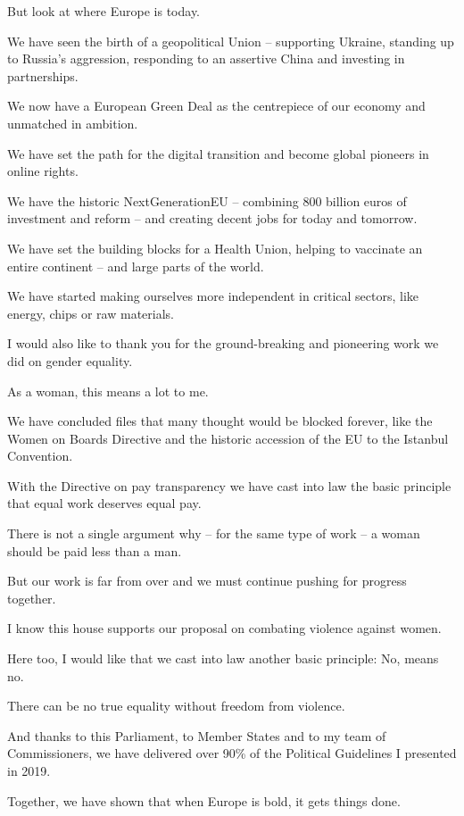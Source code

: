 \documentclass[a4paper,11pt]{article}
\begin{document}
But look at where Europe is today.

We have seen the birth of a geopolitical Union – supporting Ukraine, standing up to Russia's aggression, responding to an assertive China and investing in partnerships.

We now have a European Green Deal as the centrepiece of our economy and unmatched in ambition. 

We have set the path for the digital transition and become global pioneers in online rights.

We have the historic NextGenerationEU – combining 800 billion euros of investment and reform – and creating decent jobs for today and tomorrow.   

We have set the building blocks for a Health Union, helping to vaccinate an entire continent – and large parts of the world. 

We have started making ourselves more independent in critical sectors, like energy, chips or raw materials.

I would also like to thank you for the ground-breaking and pioneering work we did on gender equality.

As a woman, this means a lot to me.

We have concluded files that many thought would be blocked forever, like the Women on Boards Directive and the historic accession of the EU to the Istanbul Convention.

With the Directive on pay transparency we have cast into law the basic principle that equal work deserves equal pay.

There is not a single argument why – for the same type of work – a woman should be paid less than a man.

But our work is far from over and we must continue pushing for progress together.

I know this house supports our proposal on combating violence against women.

Here too, I would like that we cast into law another basic principle: No, means no.

There can be no true equality without freedom from violence.

 

And thanks to this Parliament, to Member States and to my team of Commissioners, we have delivered over 90\% of the Political Guidelines I presented in 2019.

Together, we have shown that when Europe is bold, it gets things done.
\end{document}
